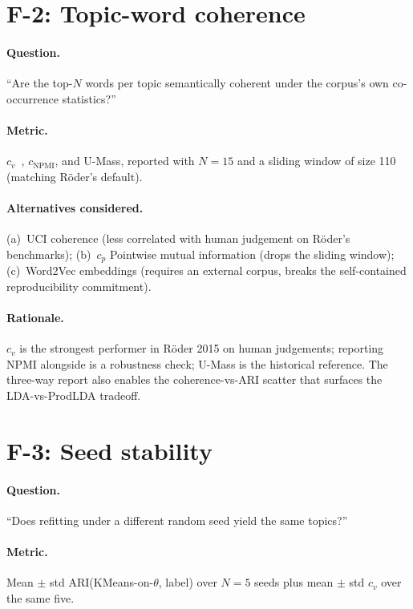 \documentclass[11pt,a4paper]{article}
\begin{document}
\section{F-2: Topic-word coherence}

\paragraph{Question.} ``Are the top-$N$ words per topic semantically
coherent under the corpus's own co-occurrence statistics?''

\paragraph{Metric.} $c_v$~\cite{roder2015exploring},
$c_{\text{NPMI}}$, and U-Mass, reported with $N = 15$ and a
sliding window of size 110 (matching Röder's default).

\paragraph{Alternatives considered.} (a)~UCI coherence (less
correlated with human judgement on Röder's benchmarks);
(b)~$c_p$ Pointwise mutual information (drops the sliding window);
(c)~Word2Vec embeddings (requires an external corpus, breaks the
self-contained reproducibility commitment).

\paragraph{Rationale.} $c_v$ is the strongest performer in Röder
2015 on human judgements; reporting NPMI alongside is a robustness
check; U-Mass is the historical reference. The three-way report
also enables the coherence-vs-ARI scatter that surfaces the
LDA-vs-ProdLDA tradeoff.

\section{F-3: Seed stability}

\paragraph{Question.} ``Does refitting under a different random
seed yield the same topics?''

\paragraph{Metric.} Mean $\pm$ std ARI(KMeans-on-$\theta$, label)
over $N = 5$ seeds plus mean $\pm$ std $c_v$ over the same five.
\end{document}
